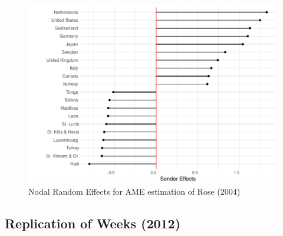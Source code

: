 \begin{figure}
\includegraphics[width=\textwidth]{rose_aeff_top10.pdf}
 \caption{Nodal Random Effects for AME estimation of Rose (2004)}\label{fig:roser}
\end{figure}
\FloatBarrier

\subsection{Replication of Weeks (2012)}

